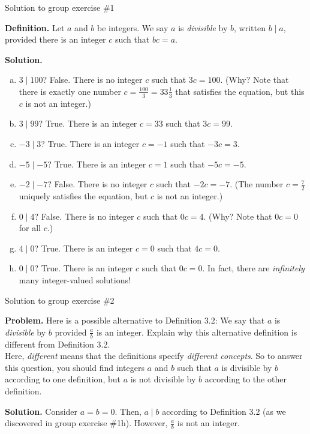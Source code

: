 \documentclass[10pt]{beamer}
\begin{document}
\begin{frame}{Solution to group exercise \#1}

\begin{mygreenbox}
\textbf{Definition.} Let $a$ and $b$ be integers.  We say $a$ is \textit{divisible} by $b$, written $b \mid a$, provided there is an integer $c$ such that $bc=a$. 	
\end{mygreenbox}
\vspace{-.2cm}
\textbf{Solution.}
\begin{enumerate}[a.]
\item $3 \mid 100$? False. There is no integer $c$ such that $3c=100$.  (Why?  Note that there is exactly one number $c=\frac{100}{3}=33 \frac{1}{3}$ that satisfies the equation, but this $c$ is not an integer.)  
\item $3 \mid 99$? True. There is an integer $c=33$ such that $3c=99$.  
\item $-3 \mid 3$? True. There is an integer $c=-1$ such that $-3c=3$.  
\item $-5 \mid -5$? True. There is an integer $c=1$ such that $-5c=-5$. 
\item $-2 \mid -7$? False. There is no integer $c$ such that $-2c=-7$.   \footnotesize (The number $c=\frac{7}{2}$ uniquely satisfies the equation, but $c$ is not an integer.) \normalsize
\item $0 \mid 4$?  False. There is no integer $c$ such that $0c=4$. (Why?  Note that $0c=0$ for all $c$.)   
\item $4 \mid 0$? True. There is an integer $c=0$ such that $4c=0$.  
\item $0 \mid 0$?  True. There is an integer $c$ such that $0c=0$. In fact, there are \textit{infinitely} many integer-valued solutions!
\end{enumerate}

\end{frame}


\begin{frame}{Solution to group exercise \#2}

\textbf{Problem.} Here is a possible alternative to Definition 3.2: We say that $a$ is \textit{divisible} by $b$ provided $\frac{a}{b}$ is an integer.  Explain why this alternative definition is different from Definition 3.2.  \\
\hspace{0.5cm} Here, \textit{different} means that the definitions specify \textit{different concepts}.  So to answer this question, you should find integers $a$ and $b$ such that $a$ is divisible by $b$ according to one definition, but $a$ is not divisible by $b$ according to the other definition.

 
\vfill 
\textbf{Solution.} Consider $a=b=0$. Then,  $a \mid b$ according to Definition 3.2 (as we discovered in group exercise \#1h). However, $\frac{a}{b}$ is not an integer.
\end{frame}
\end{document}
